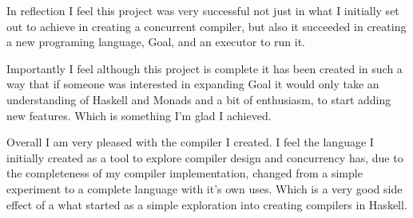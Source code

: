 In reflection I feel this project was very successful not just in what I initially set out to achieve in creating a concurrent compiler, but also it succeeded in creating a new programing language, Goal, and an executor to run it. 

Importantly I feel although this project is complete it has been created in such a way that if someone was interested in expanding Goal it would only take an understanding of Haskell and Monads and a bit of enthusiasm, to start adding new features. Which is something I'm glad I achieved. 

Overall I am very pleased with the compiler I created. I feel the language I initially created as a tool to explore compiler design and concurrency has, due to the completeness of my compiler implementation, changed from a simple experiment to a complete language with it's own uses. Which is a very good side effect of a what started as a simple exploration into creating compilers in Haskell. 
